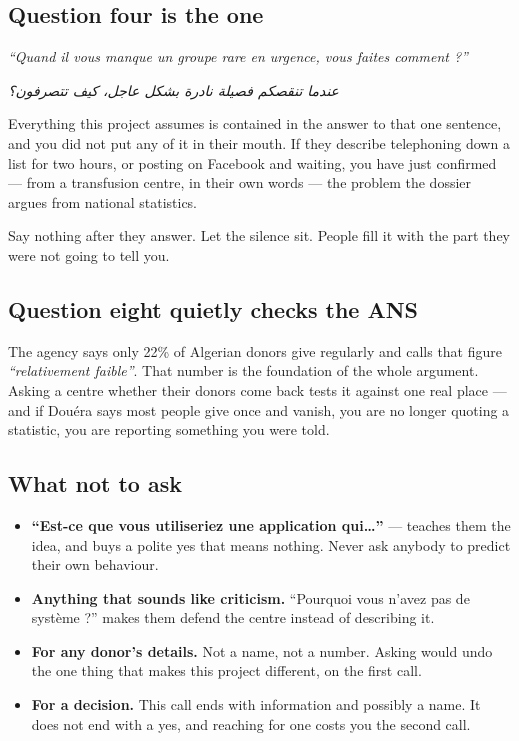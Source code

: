 \documentclass[11pt,a4paper]{article}
\newcommand{\ar}[1]{{\upshape\textarabic{#1}}}
\newenvironment{say}
  {\par\medskip\noindent\begin{lrbox}{\saybox}%
   \begin{minipage}{\dimexpr\textwidth-2\fboxsep-2pt}\itshape\vspace{4pt}}
  {\vspace{4pt}\end{minipage}\end{lrbox}%
   \fcolorbox{rule}{sayBg}{\usebox{\saybox}}\par\medskip}
\begin{document}
\subsection{Question four is the one}

\begin{say}
``Quand il vous manque un groupe rare en urgence, vous faites comment ?''
\end{say}

\begin{say}
\ar{عندما تنقصكم فصيلة نادرة بشكل عاجل، كيف تتصرفون؟}
\end{say}

Everything this project assumes is contained in the answer to that one
sentence, and you did not put any of it in their mouth. If they describe
telephoning down a list for two hours, or posting on Facebook and waiting, you
have just confirmed --- from a transfusion centre, in their own words --- the
problem the dossier argues from national statistics.

Say nothing after they answer. Let the silence sit. People fill it with the
part they were not going to tell you.

\subsection{Question eight quietly checks the ANS}

The agency says only 22\% of Algerian donors give regularly and calls that
figure \emph{``relativement faible''}. That number is the foundation of the whole
argument. Asking a centre whether their donors come back tests it against one
real place --- and if Dou\'era says most people give once and vanish, you are no
longer quoting a statistic, you are reporting something you were told.

\subsection{What not to ask}

\begin{itemize}[leftmargin=1.4em]
  \item \textbf{``Est-ce que vous utiliseriez une application qui\ldots''} ---
        teaches them the idea, and buys a polite yes that means nothing. Never
        ask anybody to predict their own behaviour.
  \item \textbf{Anything that sounds like criticism.} ``Pourquoi vous n'avez pas
        de syst\`eme ?'' makes them defend the centre instead of describing it.
  \item \textbf{For any donor's details.} Not a name, not a number. Asking would
        undo the one thing that makes this project different, on the first call.
  \item \textbf{For a decision.} This call ends with information and possibly a
        name. It does not end with a yes, and reaching for one costs you the
        second call.
\end{itemize}
\end{document}
